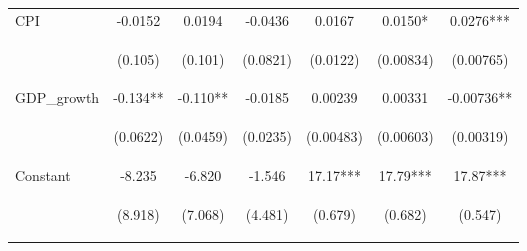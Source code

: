 \documentclass[]{article}
\begin{document}
\begin{center}
\begin{tabular}{lcccccc}
CPI & -0.0152 & 0.0194 & -0.0436 & 0.0167 & 0.0150* & 0.0276*** \\
\vspace{4pt} & \begin{footnotesize}(0.105)\end{footnotesize} & \begin{footnotesize}(0.101)\end{footnotesize} & \begin{footnotesize}(0.0821)\end{footnotesize} & \begin{footnotesize}(0.0122)\end{footnotesize} & \begin{footnotesize}(0.00834)\end{footnotesize} & \begin{footnotesize}(0.00765)\end{footnotesize} \\
GDP\_growth & -0.134** & -0.110** & -0.0185 & 0.00239 & 0.00331 & -0.00736** \\
\vspace{4pt} & \begin{footnotesize}(0.0622)\end{footnotesize} & \begin{footnotesize}(0.0459)\end{footnotesize} & \begin{footnotesize}(0.0235)\end{footnotesize} & \begin{footnotesize}(0.00483)\end{footnotesize} & \begin{footnotesize}(0.00603)\end{footnotesize} & \begin{footnotesize}(0.00319)\end{footnotesize} \\
Constant & -8.235 & -6.820 & -1.546 & 17.17*** & 17.79*** & 17.87*** \\
 & \begin{footnotesize}(8.918)\end{footnotesize} & \begin{footnotesize}(7.068)\end{footnotesize} & \begin{footnotesize}(4.481)\end{footnotesize} & \begin{footnotesize}(0.679)\end{footnotesize} & \begin{footnotesize}(0.682)\end{footnotesize} & \begin{footnotesize}(0.547)\end{footnotesize} \\

\end{tabular}
\end{center}
\end{document}
